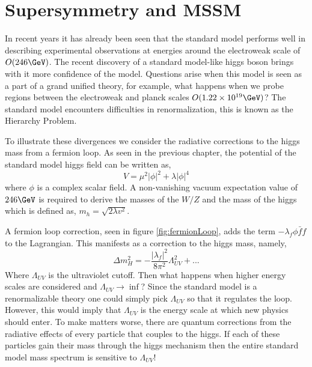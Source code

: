 \chapter{Supersymmetry and MSSM}

In recent years it has already been seen that the standard model 
performs well in describing experimental observations at energies around
the electroweak scale of $O(246 \GeV)$.
The recent discovery of a standard model-like higgs boson brings with it
more confidence of the model. Questions arise when this model is seen as 
a part of a grand unified theory, for example, what happens when we probe
regions between the electroweak and planck scales $O(1.22 \times10^{19} \GeV)$? 
The standard model encounters difficulties in renormalization, this is known
as the Hierarchy Problem.

To illustrate these divergences we consider the radiative corrections to the higgs mass
from a fermion loop.
As seen in the previous chapter, the potential of the standard model higgs field can be
written as, 
\begin{equation}
V= \mu^{2}|\phi|^{2}+\lambda|\phi|^{4}
\end{equation}
where $\phi$ is a complex scalar field.
A non-vanishing vacuum expectation value of $246 \GeV$ is required to derive the masses of the $W/Z$
and the mass of the higgs which is defined as, $m_{h}=\sqrt{2\lambda v^{2}}$.

A fermion loop correction, seen in figure \ref{fig:fermionLoop}, 
adds the term $-\lambda_{f}\phi \bar{f}f$ to the Lagrangian.
This manifests as a correction to the higgs mass, namely,
\begin{equation}
\Delta m_{H}^{2}=-\frac{|\lambda_{f}|^{2}}{8\pi^{2}}\Lambda_{UV}^{2}+...
\label{eq:SUS1}
\end{equation}
Where $\Lambda_{UV}$ is the ultraviolet cutoff. %
Then what happens when higher energy scales are considered and $\Lambda_{UV}\rightarrow \inf$?
Since the standard model is a renormalizable theory one could simply
pick $\Lambda_{UV}$ so that it regulates the loop. However, this would imply
that $\Lambda_{UV}$ is the energy scale at which new physics should enter.
To make matters worse, there are quantum corrections from the radiative
effects of every particle that couples to the higgs. If each of these 
particles gain their mass through the higgs mechanism then the entire standard model 
mass spectrum is sensitive to $\Lambda_{UV}$!

